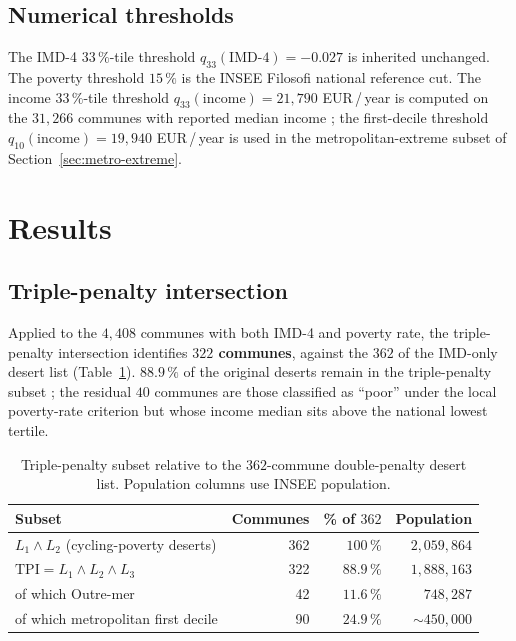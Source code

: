 \documentclass[11pt,a4paper]{article}
\newcommand{\IMD}{\mathrm{IMD}}
\newcommand{\TPI}{\mathrm{TPI}}
\begin{document}
\subsection{Numerical thresholds}

The IMD-4 $33\,\%$-tile threshold $q_{33}(\IMD\text{-}4) = -0.027$
is inherited unchanged.  The poverty threshold $15\,\%$ is the
INSEE Filosofi national reference cut.  The income $33\,\%$-tile
threshold $q_{33}(\text{income}) = 21{,}790$ EUR\,/\,year is
computed on the $31{,}266$ communes with reported median income ;
the first-decile threshold $q_{10}(\text{income}) = 19{,}940$
EUR\,/\,year is used in the metropolitan-extreme subset of
Section~\ref{sec:metro-extreme}.

\section{Results}
\label{sec:results}

\subsection{Triple-penalty intersection}

Applied to the $4{,}408$ communes with both IMD-4 and poverty
rate, the triple-penalty intersection identifies
\textbf{$322$ communes}, against the $362$ of the IMD-only desert
list (Table~\ref{tab:tpi}).  $88.9\,\%$ of the original deserts
remain in the triple-penalty subset ; the residual $40$ communes
are those classified as ``poor'' under the local poverty-rate
criterion but whose income median sits above the national lowest
tertile.

\begin{table}[H]
\centering
\caption{Triple-penalty subset relative to the $362$-commune
double-penalty desert list.  Population columns use INSEE
population.}
\label{tab:tpi}
\small
\begin{tabular}{@{}lrrr@{}}
\toprule
Subset & Communes & \% of $362$ & Population \\
\midrule
$L_1 \land L_2$ (cycling-poverty deserts)  & 362 & $100\,\%$  & $2{,}059{,}864$ \\
$\TPI = L_1 \land L_2 \land L_3$           & 322 & $88.9\,\%$ & $1{,}888{,}163$ \\
\quad of which Outre-mer                    &  42 & $11.6\,\%$ &   $748{,}287$ \\
\quad of which metropolitan first decile    &  90 & $24.9\,\%$ &   $\sim 450{,}000$ \\
\bottomrule
\end{tabular}
\end{table}
\end{document}
